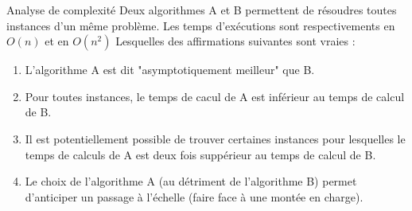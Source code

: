 \documentclass[handout]{beamer}
\begin{document}
\begin{frame}[t]{Analyse de complexité}
Deux algorithmes A et B permettent de résoudres toutes instances d'un même problème. Les temps d'exécutions sont respectivements en $O(n)$ et en $O(n^2)$
\vfill
Lesquelles des affirmations suivantes sont vraies :
\begin{enumerate}
\item L'algorithme A est dit "asymptotiquement meilleur" que B.
\item Pour toutes instances, le temps de cacul de A est inférieur au temps de calcul de B.
\item Il est potentiellement possible de trouver certaines instances pour lesquelles le temps de calculs de A est deux fois suppérieur au temps de calcul de B.
\item Le choix de l'algorithme A (au détriment de l'algorithme B) permet d'anticiper un passage à l'échelle (faire face à une montée en charge).
\end{enumerate}
\end{frame}
\end{document}
